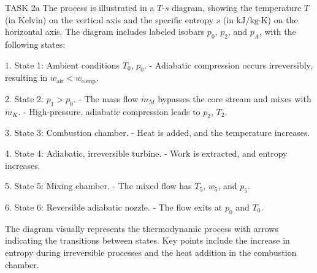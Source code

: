 TASK 2a  
The process is illustrated in a \( T \)-\( s \) diagram, showing the temperature \( T \) (in Kelvin) on the vertical axis and the specific entropy \( s \) (in \( \text{kJ}/\text{kg·K} \)) on the horizontal axis. The diagram includes labeled isobars \( p_0 \), \( p_2 \), and \( p_A \), with the following states:  

1. State 1: Ambient conditions \( T_0 \), \( p_0 \).  
   - Adiabatic compression occurs irreversibly, resulting in \( w_{\text{air}} < w_{\text{comp}} \).  

2. State 2: \( p_1 > p_0 \).  
   - The mass flow \( \dot{m}_M \) bypasses the core stream and mixes with \( \dot{m}_K \).  
   - High-pressure, adiabatic compression leads to \( p_2 \), \( T_2 \).  

3. State 3: Combustion chamber.  
   - Heat is added, and the temperature increases.  

4. State 4: Adiabatic, irreversible turbine.  
   - Work is extracted, and entropy increases.  

5. State 5: Mixing chamber.  
   - The mixed flow has \( T_5 \), \( w_5 \), and \( p_5 \).  

6. State 6: Reversible adiabatic nozzle.  
   - The flow exits at \( p_0 \) and \( T_0 \).  

The diagram visually represents the thermodynamic process with arrows indicating the transitions between states. Key points include the increase in entropy during irreversible processes and the heat addition in the combustion chamber.